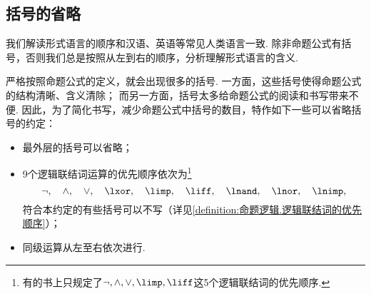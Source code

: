 \subsection{括号的省略}
我们解读形式语言的顺序和汉语、英语等常见人类语言一致.
除非命题公式有括号，否则我们总是按照从左到右的顺序，分析理解形式语言的含义.

严格按照命题公式的定义，就会出现很多的括号.
一方面，这些括号使得命题公式的结构清晰、含义清除；
而另一方面，括号太多给命题公式的阅读和书写带来不便.
因此，为了简化书写，减少命题公式中括号的数目，特作如下一些可以省略括号的约定：\begin{itemize}
	\item 最外层的括号可以省略；
	\item 9个逻辑联结词运算的优先顺序依次为\footnote{
		有的书上只规定了\(\neg,\land,\lor,\limp,\liff\)这5个逻辑联结词的优先顺序.
	}\[
		\neg, \quad
		\land, \quad
		\lor, \quad
		\lxor, \quad
		\limp, \quad
		\liff, \quad
		\lnand, \quad
		\lnor, \quad
		\lnimp,
	\]
	符合本约定的有些括号可以不写（详见\cref{definition:命题逻辑.逻辑联结词的优先顺序}）；
	\item 同级运算从左至右依次进行.
\end{itemize}

